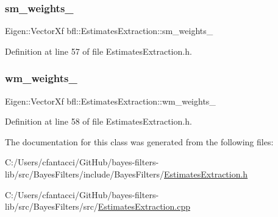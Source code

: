 \subsubsection{\texorpdfstring{sm\+\_\+weights\+\_\+}{sm\_weights\_}}
{\footnotesize\ttfamily Eigen\+::\+Vector\+Xf bfl\+::\+Estimates\+Extraction\+::sm\+\_\+weights\+\_\+\hspace{0.3cm}{\ttfamily [protected]}}



Definition at line 57 of file Estimates\+Extraction.\+h.

\mbox{\label{classbfl_1_1EstimatesExtraction_adf4378ec3f7223050e2616e86cfe69c8}} 
\subsubsection{\texorpdfstring{wm\+\_\+weights\+\_\+}{wm\_weights\_}}
{\footnotesize\ttfamily Eigen\+::\+Vector\+Xf bfl\+::\+Estimates\+Extraction\+::wm\+\_\+weights\+\_\+\hspace{0.3cm}{\ttfamily [protected]}}



Definition at line 58 of file Estimates\+Extraction.\+h.



The documentation for this class was generated from the following files\+:\begin{DoxyCompactItemize}
\item 
C\+:/\+Users/cfantacci/\+Git\+Hub/bayes-\/filters-\/lib/src/\+Bayes\+Filters/include/\+Bayes\+Filters/\mbox{\hyperlink{EstimatesExtraction_8h}{Estimates\+Extraction.\+h}}\item 
C\+:/\+Users/cfantacci/\+Git\+Hub/bayes-\/filters-\/lib/src/\+Bayes\+Filters/src/\mbox{\hyperlink{EstimatesExtraction_8cpp}{Estimates\+Extraction.\+cpp}}\end{DoxyCompactItemize}

